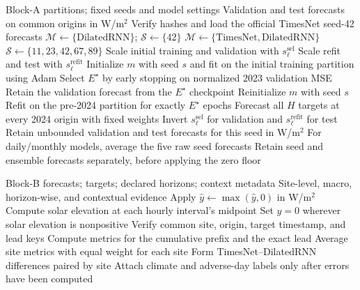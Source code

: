 \begin{algorithm}[H]
\caption{TimesNet--DilatedRNN selection and direct forecasting}
\label{alg:supp-block-b}
\footnotesize
\begin{algorithmic}[1]
\Require Block-A partitions; fixed seeds and model settings
\Ensure Validation and test forecasts on common origins in W/m$^2$
  \State Verify hashes and load the official TimesNet seed-42 forecasts
  \State $\mathcal M\gets\{\mathrm{DilatedRNN}\}$; $\mathcal S\gets\{42\}$
\Else
  \State $\mathcal M\gets\{\mathrm{TimesNet,DilatedRNN}\}$
  \State $\mathcal S\gets\{11,23,42,67,89\}$
\EndIf
\State Scale initial training and validation with $s_{\ell}^{\mathrm{sel}}$
\State Scale refit and test with $s_{\ell}^{\mathrm{refit}}$
  \State Initialize $m$ with seed $s$ and fit on the initial training partition using Adam
  \State Select $E^\star$ by early stopping on normalized 2023 validation MSE
  \State Retain the validation forecast from the $E^\star$ checkpoint
  \State Reinitialize $m$ with seed $s$
  \State Refit on the pre-2024 partition for exactly $E^\star$ epochs
  \State Forecast all $H$ targets at every 2024 origin with fixed weights
  \State Invert $s_{\ell}^{\mathrm{sel}}$ for validation and $s_{\ell}^{\mathrm{refit}}$ for test
  \State Retain unbounded validation and test forecasts for this seed in W/m$^2$
\EndFor
\State For daily/monthly models, average the five raw seed forecasts
\State Retain seed and ensemble forecasts separately, before applying the zero floor
\end{algorithmic}
\end{algorithm}

\begin{algorithm}[H]
\caption{Post-processing, metrics, and contextual analysis}
\label{alg:supp-block-c}
\footnotesize
\begin{algorithmic}[1]
\Require Block-B forecasts; targets; declared horizons; context metadata
\Ensure Site-level, macro, horizon-wise, and contextual evidence
  \State Apply $\widehat y\leftarrow\max(\widehat y,0)$ in W/m$^2$
    \State Compute solar elevation at each hourly interval's midpoint
    \State Set $\widehat y=0$ wherever solar elevation is nonpositive
  \EndIf
\EndFor
\State Verify common site, origin, target timestamp, and lead keys
  \State Compute metrics for the cumulative prefix and the exact lead
\EndFor
\State Average site metrics with equal weight for each site
\State Form TimesNet--DilatedRNN differences paired by site
\State Attach climate and adverse-day labels only after errors have been computed
\end{algorithmic}
\end{algorithm}
